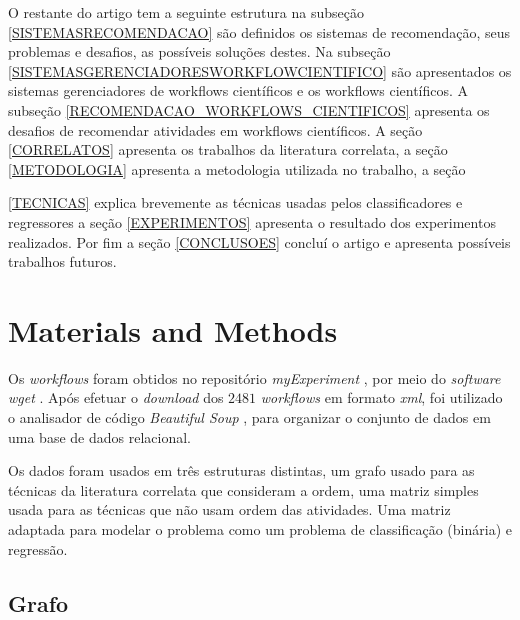 \documentclass[10pt]{article}
\begin{document}
O restante do artigo tem a seguinte estrutura na subse\c{c}{\~a}o \ref{SISTEMASRECOMENDACAO} s{\~a}o definidos os sistemas de recomenda\c{c}{\~a}o, seus problemas e desafios, as poss{\'i}veis solu\c{c}{\~o}es destes. Na subse\c{c}{\~a}o \ref{SISTEMASGERENCIADORESWORKFLOWCIENTIFICO} s{\~a}o apresentados os sistemas gerenciadores de workflows cient{\'i}ficos e os workflows cient{\'i}ficos. A subse\c{c}{\~a}o \ref{RECOMENDACAO_WORKFLOWS_CIENTIFICOS} apresenta os desafios de recomendar atividades em workflows cient{\'i}ficos. A se\c{c}{\~a}o \ref{CORRELATOS} apresenta os trabalhos da literatura correlata, a se\c{c}{\~a}o \ref{METODOLOGIA} apresenta a metodologia utilizada no trabalho, a se\c{c}{\~a}o 

\ref{TECNICAS} explica brevemente as t{\'e}cnicas usadas pelos classificadores e regressores a se\c{c}{\~a}o \ref{EXPERIMENTOS} apresenta o resultado dos experimentos realizados. Por fim a se\c{c}{\~a}o \ref{CONCLUSOES} conclu{\'i} o artigo e apresenta poss{\'i}veis trabalhos futuros.


\section*{Materials and Methods}\label{sec:method}
Os \emph{workflows} foram obtidos no repositório \emph{myExperiment} \cite{ROURE2015}, por meio do \emph{software wget} \cite{wget2015}. Após efetuar o \emph{download} dos \(2481\) \emph{workflows} em formato \emph{xml}, foi utilizado o analisador de código \emph{Beautiful Soup} \cite{BeautifulSoup2015}, para organizar o conjunto de dados em uma base de dados relacional.

Os dados foram usados em três estruturas distintas, um grafo usado para as técnicas da literatura correlata que consideram a ordem, uma matriz simples usada para as técnicas que não usam ordem das atividades. Uma matriz adaptada para modelar o problema como um problema de classificação (binária) e regressão.


\subsection*{Grafo}



\end{document}
